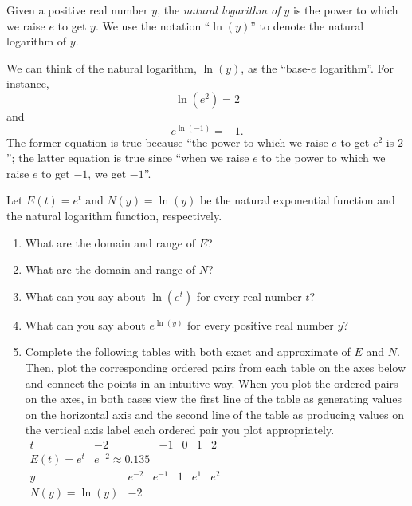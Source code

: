 \documentclass[nooutcomes]{ximera}
\begin{document}
Given a positive real number \(y\), the \emph{natural logarithm of \(y\)} is the power to which we raise \(e\) to get \(y\).  We use the notation ``\(\ln(y)\)'' to denote the natural logarithm of \(y\).%

We can think of the natural logarithm, \(\ln(y)\), as the ``base-\(e\) logarithm''.  For instance,%
\begin{equation*}
\ln(e^2) = 2
\end{equation*}
and%
\begin{equation*}
e^{\ln(-1)} = -1\text{.}
\end{equation*}
The former equation is true because ``the power to which we raise \(e\) to get \(e^2\) is \(2\)''; the latter equation is true since ``when we raise \(e\) to the power to which we raise \(e\) to get \(-1\), we get \(-1\)''.
\begin{exploration}
Let \(E(t) = e^t\) and \(N(y) = \ln(y)\) be the natural exponential function and the natural logarithm function, respectively.%

\begin{enumerate}[label=\alph*.]
\item
What are the domain and range of \(E\)?%
\item
What are the domain and range of \(N\)?%
\item
What can you say about \(\ln(e^t)\) for every real number \(t\)?%
\item
What can you say about \(e^{\ln(y)}\) for every positive real number \(y\)?%
\item
Complete the following tables with both exact and approximate of \(E\) and \(N\).  Then, plot the corresponding ordered pairs from each table on the axes below and connect the points in an intuitive way.  When you plot the ordered pairs on the axes, in both cases view the first line of the table as generating values on the horizontal axis and the second line of the table as producing values on the vertical axis label each ordered pair you plot appropriately.%
%
\\
$
\begin{array}{l|lllll}
t&-2&-1&0&1&2\\
\hline
E(t)=e^t&e^{-2} \approx 0.135&&&&
\end{array}
$
\\
$
\begin{array}{l|lllll}
y&e^{-2}&e^{-1}&1&e^1&e^2\\
\hline
N(y)=\ln(y)&-2&&&&
\end{array}
$
%


\end{enumerate}
\end{exploration}
\end{document}
